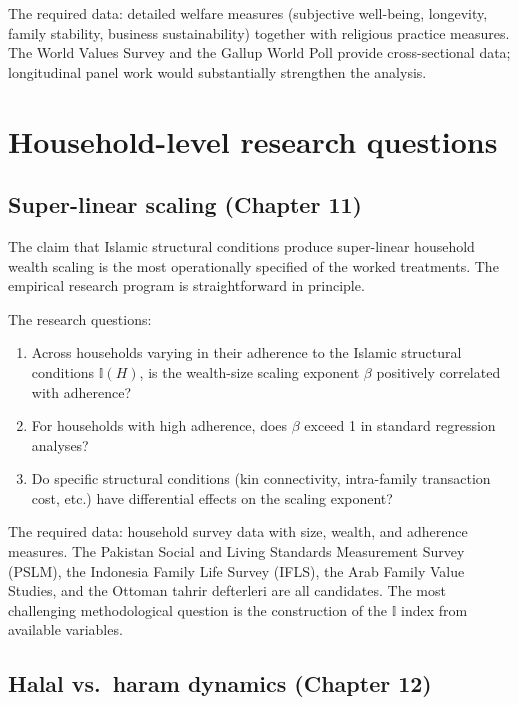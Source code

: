 The required data: detailed welfare measures (subjective well-being,
longevity, family stability, business sustainability) together
with religious practice measures. The World Values Survey and the
Gallup World Poll provide cross-sectional data; longitudinal panel
work would substantially strengthen the analysis.

\section{Household-level research questions}
\label{sec:agenda-household}

\subsection{Super-linear scaling (Chapter 11)}

The claim that Islamic structural conditions produce super-linear
household wealth scaling is the most operationally specified of
the worked treatments. The empirical research program is
straightforward in principle.

The research questions:

\begin{enumerate}[leftmargin=2em]
    \item Across households varying in their adherence to the
    Islamic structural conditions $\mathbb{I}(H)$, is the
    wealth-size scaling exponent $\beta$ positively correlated
    with adherence?
    \item For households with high adherence, does $\beta$ exceed
    1 in standard regression analyses?
    \item Do specific structural conditions (kin connectivity,
    intra-family transaction cost, etc.) have differential effects
    on the scaling exponent?
\end{enumerate}

The required data: household survey data with size, wealth, and
adherence measures. The Pakistan Social and Living Standards
Measurement Survey (PSLM), the Indonesia Family Life Survey
(IFLS), the Arab Family Value Studies, and the Ottoman tahrir
defterleri are all candidates. The most challenging methodological
question is the construction of the $\mathbb{I}$ index from
available variables.

\subsection{Halal vs.\ haram dynamics (Chapter 12)}

